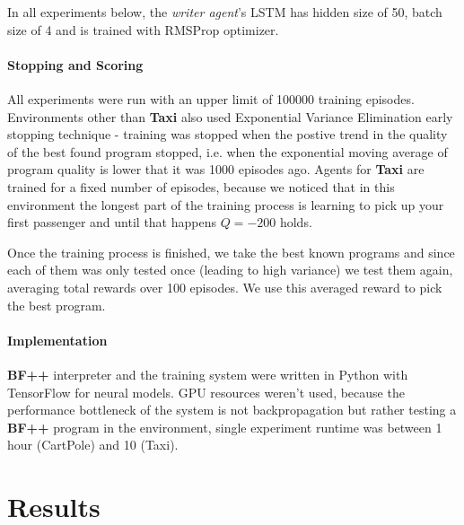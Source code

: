 In all experiments below, the \emph{writer agent}'s LSTM has hidden size of 50, batch size of 4 and is trained with RMSProp \cite{rmsprop} optimizer.

\paragraph{Stopping and Scoring}

All experiments were run with an upper limit of 100000 training episodes.
Environments other than \textbf{Taxi} also used Exponential Variance Elimination \cite{evestop} early stopping technique - training was stopped when the postive trend in the quality of the best found program stopped, i.e. when the exponential moving average of program quality is lower that it was 1000 episodes ago.
Agents for \textbf{Taxi} are trained for a fixed number of episodes, because we noticed that in this environment the longest part of the training process is learning to pick up your first passenger and until that happens $Q=-200$ holds.

Once the training process is finished, we take the best known programs and since each of them was only tested once (leading to high variance) we test them again, averaging total rewards over 100 episodes. 
We use this averaged reward to pick the best program.

\paragraph{Implementation}

\textbf{BF++} interpreter and the training system were written in Python with TensorFlow for neural models.
GPU resources weren't used, because the performance bottleneck of the system is not backpropagation but rather testing a \textbf{BF++} program in the environment, single experiment runtime was between 1 hour (CartPole) and 10 (Taxi).

\newpage
\section{Results}

